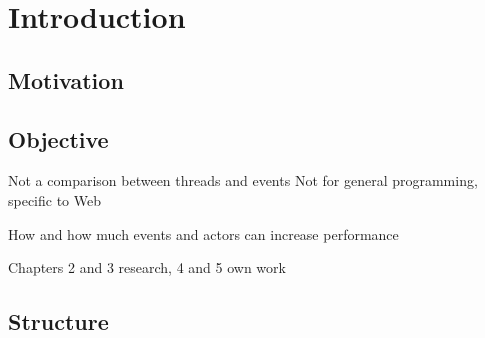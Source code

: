 \chapter{Introduction}

\section{Motivation}

\section{Objective}

Not a comparison between threads and events
Not for general programming, specific to Web

How and how much events and actors can increase performance

Chapters 2 and 3 research, 4 and 5 own work

\section{Structure}